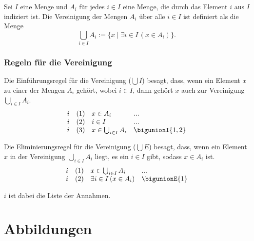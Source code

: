 \documentclass[main.tex]{subfiles}
\begin{document}
\begin{definition}
    Sei \( I \) eine Menge und \( A_i \) für jedes \( i \in I \) eine Menge, die durch das Element \( i \) aus \( I \) indiziert ist. Die Vereinigung der Mengen \( A_i \) über alle \( i \in I \) ist definiert als die Menge
    \[
    \bigcup_{i \in I} A_i := \{ x \mid \exists i \in I \, (x \in A_i) \}.
    \]
\end{definition}

\subsection{Regeln für die Vereinigung}
\label{rule:bigunionI} \label{rule:bigunionE}

Die Einführungsregel für die Vereinigung (\(\bigcup I\)) besagt, dass, wenn ein Element \( x \) zu einer der Mengen \( A_i \) gehört, wobei \( i \in I \), dann gehört \( x \) auch zur Vereinigung \(\bigcup_{i \in I} A_i\).
\[
\begin{array}{llll}
    i & (1) & x \in A_i & ... \\
    i & (2) & i \in I & ... \\
    i & (3) & x \in \bigcup_{i \in I} A_i & \bigunionI{1,2} \\
\end{array}
\]

Die Eliminierungsregel für die Vereinigung (\(\bigcup E\)) besagt, dass, wenn ein Element \( x \) in der Vereinigung \(\bigcup_{i \in I} A_i\) liegt, es ein \( i \in I \) gibt, sodass \( x \in A_i \) ist.
\[
\begin{array}{llll}
    i & (1) & x \in \bigcup_{i \in I} A_i & ... \\
    i & (2) & \exists i \in I \, (x \in A_i) & \bigunionE{1} \\
\end{array}
\]

\(i\) ist dabei die Liste der Annahmen.


\chapter{Abbildungen}
\end{document}

